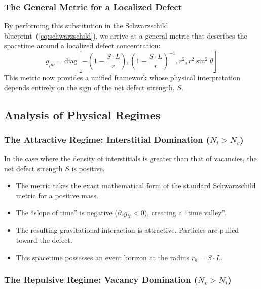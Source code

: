 \documentclass[%
  reprint,
  superscriptaddress,
  showpacs,
  showkeys,
  amsmath,amssymb,
  pra,
  longbibliography,
  floatfix,
  x11names
]{revtex4-2}
\begin{document}
\subsubsection{The General Metric for a Localized Defect}
\label{2025-menger-gmld}
By performing this substitution in the Schwarzschild blueprint~(\ref{eq:schwarzschild}), we arrive at a general metric that describes the spacetime around a localized defect concentration:
\begin{equation}
g_{\mu\nu} = \text{diag}\left[-\left(1 - \frac{S \cdot L}{r}\right), \left(1 - \frac{S \cdot L}{r}\right)^{-1}, r^2, r^2 \sin^2 \theta\right]
\label{eq:defect_metric}
\end{equation}
This metric now provides a unified framework whose physical interpretation depends entirely on the sign of the net defect strength, $S$.

\subsection{Analysis of Physical Regimes}

\subsubsection{The Attractive Regime: Interstitial Domination ($N_i > N_v$)}

In the case where the density of interstitials is greater than that of vacancies, the net defect strength $S$ is positive.
\begin{itemize}
    \item The metric takes the exact mathematical form of the standard Schwarzschild metric for a positive mass.
    \item The ``slope of time'' is negative ($\partial_r g_{tt} < 0$), creating a ``time valley''.
    \item {The resulting gravitational interaction is attractive.} Particles are pulled toward the defect.
    \item This spacetime possesses an event horizon at the radius $r_h = S \cdot L$.
\end{itemize}

\subsubsection{The Repulsive Regime: Vacancy Domination ($N_v > N_i$)}
\end{document}
